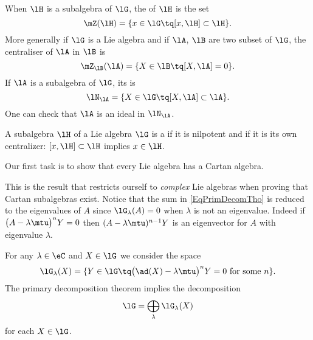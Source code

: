 \begin{definition}\label{PgDefCentralisateur}
    When \( \lH\) is a subalgebra of \( \lG\), the  of \( \lH\) is the set
    \begin{equation}
        \mZ(\lH)=\{x\in\lG\tq [x,\lH]\subset\lH\}.
    \end{equation}
    More generally if $\lG$ is a Lie algebra and if $\lA$, $\lB$ are two subset of $\lG$, the centraliser of $\lA$ in $\lB$ is
    \begin{equation}
        \mZ_{\lB}(\lA)=\{X\in\lB\tq [X,\lA]=0\}.
    \end{equation}
    If $\lA$ is a subalgebra of $\lG$, its  is 
    \begin{equation}
        \lN_{\lA}=\{X\in\lG\tq [X,\lA]\subset\lA\}.
    \end{equation}
    One can check that $\lA$ is an ideal in $\lN_{\lA}$.
\end{definition}

\begin{definition}
A subalgebra $\lH$ of a Lie algebra $\lG$ is a  if it is nilpotent and if it is its own centralizer: $[x,\lH]\subset\lH$ implies $x\in\lH$.
\end{definition}

Our first task is to show that every Lie algebra has a Cartan algebra.

This is the result that restricts ourself to \emph{complex} Lie algebras when proving that Cartan subalgebras exist. Notice that the sum in \eqref{EqPrimDecomTho} is reduced to the eigenvalues of \( A\) since \( \lG_{\lambda}(A)=0\) when \( \lambda\) is not an eigenvalue. Indeed if \( \big( A-\lambda\mtu \big)^nY=0\) then \( (A-\lambda\mtu)^{n-1}Y\) is an eigenvector for \( A\) with eigenvalue \( \lambda\).

For any \( \lambda\in\eC\) and \( X\in\lG\) we consider the space
\begin{equation}
    \lG_{\lambda}(X)=\{ Y\in\lG\tq \big( \ad(X)-\lambda\mtu \big)^nY=0\text{ for some \( n\)} \}.
\end{equation}
The primary decomposition theorem implies the decomposition
\begin{equation}        \label{EqDecomplGpRimDecombijk}
    \lG=\bigoplus_{\lambda}\lG_{\lambda}(X)
\end{equation}
for each \( X\in\lG\). 

